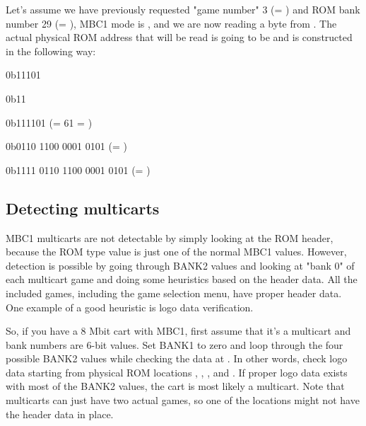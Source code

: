 \documentclass[\main/gbctr.tex]{subfiles}
\begin{document}
Let's assume we have previously requested "game number" 3 (= )
and ROM bank number 29 (= ), MBC1 mode is , and we are
now reading a byte from . The actual physical ROM address that
will be read is going to be  and is constructed in the
following way:

\begin{description}[leftmargin=15em,style=nextline]
  \item[Value of the BANK1 register]
  {
    \ttfamily
    0b\colorbox{gray!10}{1}\colorbox{blue!30}{1101}
  }
  \item[Value of the BANK2 register]
  {
    \ttfamily
    0b\colorbox{red!30}{11}
  }
  \item[ROM bank number]
  {
    \ttfamily
    0b\colorbox{red!30}{11}\colorbox{blue!30}{1101} (= 61 = )
  }
  \item[Address being read]
  {
    \ttfamily
    0b\colorbox{gray!10}{01}\colorbox{green!30}{10 1100 0001 0101} (= )
  }
  \item[Actual physical ROM address]
  {
    \ttfamily
    0b\colorbox{red!30}{11}\colorbox{blue!30}{11 01}\colorbox{green!30}{10 1100 0001 0101} (= )
  }
\end{description}

\subsection{Detecting multicarts}

MBC1 multicarts are not detectable by simply looking at the ROM header, because
the ROM type value is just one of the normal MBC1 values. However, detection is
possible by going through BANK2 values and looking at "bank 0" of each
multicart game and doing some heuristics based on the header data. All the
included games, including the game selection menu, have proper header data.
One example of a good heuristic is logo data verification.

So, if you have a 8 Mbit cart with MBC1, first assume that it's a multicart and
bank numbers are 6-bit values. Set BANK1 to zero and loop through the four
possible BANK2 values while checking the data at . In
other words, check logo data starting from physical ROM locations ,
, , and . If proper logo data exists with most
of the BANK2 values, the cart is most likely a multicart. Note that multicarts
can just have two actual games, so one of the locations might not have the
header data in place.
\end{document}
